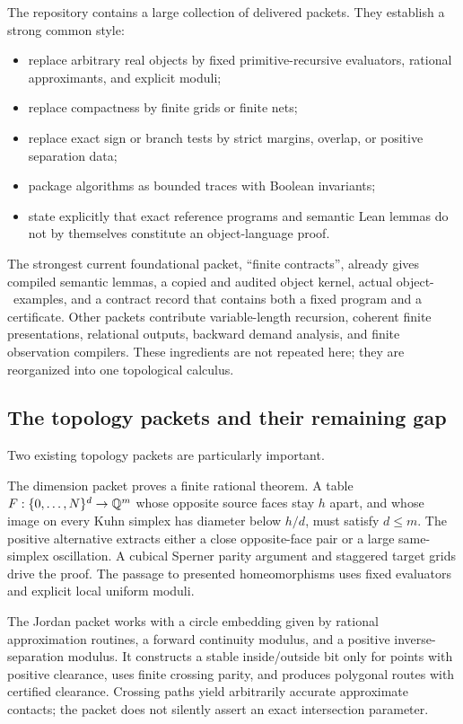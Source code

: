The repository contains a large collection of delivered packets.  They establish a strong common style:
\begin{itemize}
  \item replace arbitrary real objects by fixed primitive-recursive evaluators, rational approximants, and explicit moduli;
  \item replace compactness by finite grids or finite nets;
  \item replace exact sign or branch tests by strict margins, overlap, or positive separation data;
  \item package algorithms as bounded traces with Boolean invariants;
  \item state explicitly that exact reference programs and semantic Lean lemmas do not by themselves constitute an object-language proof.
\end{itemize}

The strongest current foundational packet, ``finite contracts'', already gives compiled semantic lemmas, a copied and audited object kernel, actual object-\ipra\ examples, and a contract record that contains both a fixed  program and a  certificate.  Other packets contribute variable-length recursion, coherent finite presentations, relational outputs, backward demand analysis, and finite observation compilers.  These ingredients are not repeated here; they are reorganized into one topological calculus.

\subsection{The topology packets and their remaining gap}

Two existing topology packets are particularly important.

The dimension packet proves a finite rational theorem.  A table
$F:\{0,\ldots,N\}^{d}\to\mathbb{Q}^{m}$ whose opposite source faces stay $h$ apart, and whose image on every Kuhn simplex has diameter below $h/d$, must satisfy $d\leq m$.  The positive alternative extracts either a close opposite-face pair or a large same-simplex oscillation.  A cubical Sperner parity argument and staggered target grids drive the proof.  The passage to presented homeomorphisms uses fixed evaluators and explicit local uniform moduli.

The Jordan packet works with a circle embedding given by rational approximation routines, a forward continuity modulus, and a positive inverse-separation modulus.  It constructs a stable inside/outside bit only for points with positive clearance, uses finite crossing parity, and produces polygonal routes with certified clearance.  Crossing paths yield arbitrarily accurate approximate contacts; the packet does not silently assert an exact intersection parameter.

